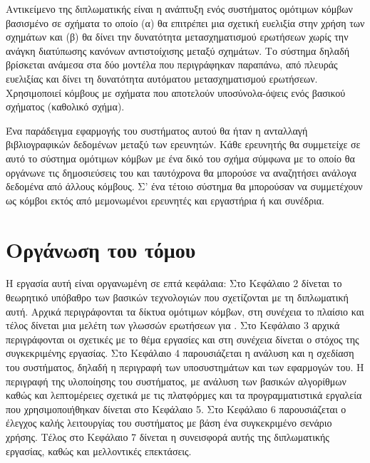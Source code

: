 Αντικείμενο της διπλωματικής είναι η ανάπτυξη ενός συστήματος
ομότιμων κόμβων βασισμένο σε σχήματα το οποίο (α) θα επιτρέπει μια
σχετική ευελιξία στην χρήση των σχημάτων και (β) θα δίνει την
δυνατότητα μετασχηματισμού ερωτήσεων χωρίς την ανάγκη διατύπωσης
κανόνων αντιστοίχισης μεταξύ σχημάτων. Το σύστημα δηλαδή βρίσκεται
ανάμεσα στα δύο μοντέλα που περιγράφηκαν παραπάνω, από πλευράς
ευελιξίας και δίνει τη δυνατότητα αυτόματου μετασχηματισμού
ερωτήσεων. Χρησιμοποιεί κόμβους με σχήματα  που αποτελούν
υποσύνολα-όψεις  ενός βασικού σχήματος (καθολικό
σχήμα).

Ένα παράδειγμα εφαρμογής του συστήματος αυτού θα ήταν η ανταλλαγή
βιβλιογραφικών δεδομένων μεταξύ των ερευνητών. Κάθε ερευνητής θα
συμμετείχε σε αυτό το σύστημα ομότιμων κόμβων με ένα δικό του
 σχήμα σύμφωνα με το οποίο θα οργάνωνε τις δημοσιεύσεις
του και ταυτόχρονα θα μπορούσε να αναζητήσει ανάλογα δεδομένα από
άλλους κόμβους. Σ' ένα τέτοιο σύστημα θα μπορούσαν να συμμετέχουν
ως κόμβοι εκτός από μεμονωμένοι ερευνητές και εργαστήρια ή και
συνέδρια.

\section{Οργάνωση του τόμου}
Η εργασία αυτή είναι οργανωμένη σε επτά κεφάλαια: Στο Κεφάλαιο 2
δίνεται το θεωρητικό υπόβαθρο των βασικών τεχνολογιών που
σχετίζονται με τη διπλωματική αυτή. Αρχικά περιγράφονται τα δίκτυα
ομότιμων κόμβων, στη συνέχεια το πλαίσιο  και τέλος
δίνεται μια μελέτη των γλωσσών ερωτήσεων για . Στο
Κεφάλαιο 3 αρχικά περιγράφονται οι σχετικές με το θέμα εργασίες
και στη συνέχεια δίνεται ο στόχος της συγκεκριμένης εργασίας. Στο
Κεφάλαιο 4 παρουσιάζεται η ανάλυση και η σχεδίαση του συστήματος,
δηλαδή η περιγραφή των υποσυστημάτων και των εφαρμογών του. Η
περιγραφή της υλοποίησης του συστήματος, με ανάλυση των βασικών
αλγορίθμων καθώς και λεπτομέρειες σχετικά με τις πλατφόρμες και τα
προγραμματιστικά εργαλεία που χρησιμοποιήθηκαν δίνεται στο
Κεφάλαιο 5. Στο Κεφάλαιο 6 παρουσιάζεται ο έλεγχος καλής
λειτουργίας του συστήματος με βάση ένα συγκεκριμένο σενάριο
χρήσης. Τέλος στο Κεφάλαιο 7 δίνεται η συνεισφορά αυτής της
διπλωματικής εργασίας, καθώς και μελλοντικές επεκτάσεις.

